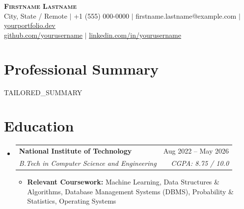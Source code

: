 \documentclass[letterpaper,11pt]{article}
\makeatletter
\newcommand{\resumeItem}[1]{
  \item\small{
    {#1 \vspace{-1pt}}
  }
}
\newcommand{\resumeSubheading}[4]{
  \vspace{-2pt}\item
    \begin{tabularx}{\textwidth}{@{}X r@{}}
      \textbf{#1} & #2 \\
      \textit{\small#3} & \textit{\small #4} \\
    \end{tabularx}\vspace{-6pt}
}
\newcommand{\resumeSubHeadingListStart}{\begin{itemize}[leftmargin=0pt, label={}]\vspace{-2pt}}
\newcommand{\resumeSubHeadingListEnd}{\end{itemize}\vspace{-3pt}}
\newcommand{\resumeItemListStart}{\begin{itemize}[leftmargin=*, itemsep=1.0pt, parsep=0pt]}
\newcommand{\resumeItemListEnd}{\end{itemize}\vspace{-5pt}}
\makeatother
\begin{document}
\begin{center}
    \textbf{\Huge \scshape Firstname Lastname} \\ \vspace{2pt}
    \small City, State / Remote $|$ +1 (555) 000-0000 $|$ firstname.lastname@example.com $|$ \href{https://yourportfolio.dev}{\underline{yourportfolio.dev}} \\ \vspace{1pt}
    \small \href{https://github.com/yourusername}{\underline{github.com/yourusername}} $|$ \href{https://linkedin.com/in/yourusername}{\underline{linkedin.com/in/yourusername}}
\end{center}

\section{Professional Summary}
 \begin{itemize}[leftmargin=0pt, label={}]\vspace{-3pt}
    \small{\item{
     {{TAILORED_SUMMARY}}
    }}
 \end{itemize}\vspace{-3pt}

\section{Education}
  \resumeSubHeadingListStart
    \resumeSubheading
      {National Institute of Technology}{Aug 2022 -- May 2026}
      {B.Tech in Computer Science and Engineering}{CGPA: 8.75 / 10.0}
      \resumeItemListStart
        \resumeItem{\textbf{Relevant Coursework:} Machine Learning, Data Structures \& Algorithms, Database Management Systems (DBMS), Probability \& Statistics, Operating Systems}
      \resumeItemListEnd
  \resumeSubHeadingListEnd

\end{document}
